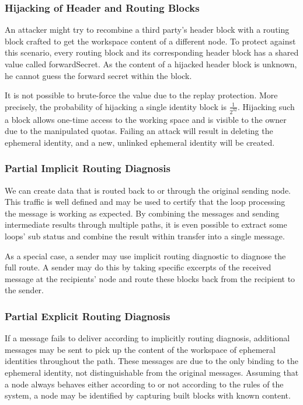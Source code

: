 \subsubsection{Hijacking of Header and Routing Blocks}
An attacker might try to recombine a third party's header block with a routing block crafted to get the workspace content of a different node. To protect against this scenario, every routing block and its corresponding header block has a shared value called forwardSecret. As the content of a hijacked header block is unknown, he cannot guess the forward secret within the block.

It is not possible to brute-force the value due to the replay protection. More precisely, the probability of hijacking a single identity block is $\frac{1}{2^{32}}$. Hijacking such a block allows one-time access to the working space and is visible to the owner due to the manipulated quotas. Failing an attack will result in deleting the ephemeral identity, and a new, unlinked ephemeral identity will be created. 

\subsubsection{Partial Implicit Routing Diagnosis}
We can create data that is routed back to or through the original sending node. This traffic is well defined and may be used to certify that the loop processing the message is working as expected. By combining the messages and sending intermediate results through multiple paths, it is even possible to extract some loops' sub status and combine the result within transfer into a single message.

As a special case, a sender may use implicit routing diagnostic to diagnose the full route. A sender may do this by taking specific excerpts of the received message at the recipients' node and route these blocks back from the recipient to the sender. 

\subsubsection{Partial Explicit Routing Diagnosis}
If a message fails to deliver according to implicitly routing diagnosis, additional messages may be sent to pick up the content of the workspace of ephemeral identities throughout the path. These messages are due to the only binding to the ephemeral identity, not distinguishable from the original messages. Assuming that a node always behaves either according to or not according to the rules of the system, a node may be identified by capturing built blocks with known content.

